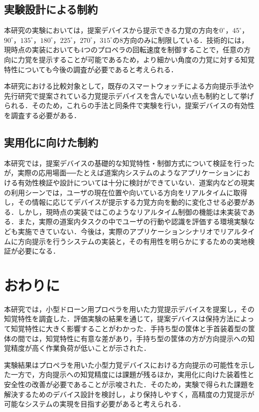 \documentclass[a4paper,11pt]{jreport}
\begin{document}
\section{実験設計による制約}
本研究の実験においては，提案デバイスから提示できる力覚の方向を$0^\circ$，$45^\circ$，$90^\circ$，$135^\circ$，$180^\circ$，$225^\circ$，$270^\circ$，$315^\circ$の8方向のみに制限している．技術的には，現時点の実装においても4つのプロペラの回転速度を制御することで，任意の方向に力覚を提示することが可能であるため，より細かい角度の力覚に対する知覚特性についても今後の調査が必要であると考えられる．

本研究における比較対象として，既存のスマートウォッチによる方向提示手法や先行研究で提案されている力覚提示デバイスを含んでいない点も制約として挙げられる．そのため，これらの手法と同条件で実験を行い，提案デバイスの有効性を調査する必要がある．

\section{実用化に向けた制約}
本研究では，提案デバイスの基礎的な知覚特性・制御方式について検証を行ったが，実際の応用場面──たとえば道案内システムのようなアプリケーションにおける有効性検証や設計については十分に検討ができていない．道案内などの現実の利用シーンでは，ユーザの現在位置や向いている方向をリアルタイムに取得し，その情報に応じてデバイスが提示する力覚方向を動的に変化させる必要がある．しかし，現時点の実装ではこのようなリアルタイム制御の機能は未実装である．また，実際の道案内タスクの中でユーザの行動や認識を評価する環境実験なども実施できていない．今後は，実際のアプリケーションシナリオでリアルタイムに方向提示を行うシステムの実装と，その有用性を明らかにするための実地検証が必要になる．

\chapter{おわりに}
本研究では，小型ドローン用プロペラを用いた力覚提示デバイスを提案し，その知覚特性を調査した．評価実験の結果を通じて，提案デバイスは保持方法によって知覚特性に大きく影響することがわかった．手持ち型の筐体と手首装着型の筐体の間では，知覚特性に有意な差があり，手持ち型の筐体の方が方向提示への知覚精度が高く作業負荷が低いことが示された．

実験結果はプロペラを用いた小型力覚デバイスにおける方向提示の可能性を示した一方で，方向提示への知覚精度には課題が残るほか，実用化に向けた装着性と安全性の改善が必要であることが示唆された．そのため，実験で得られた課題を解決するためのデバイス設計を検討し，より保持しやすく，高精度の力覚提示が可能なシステムの実現を目指す必要があると考えられる．
\end{document}
